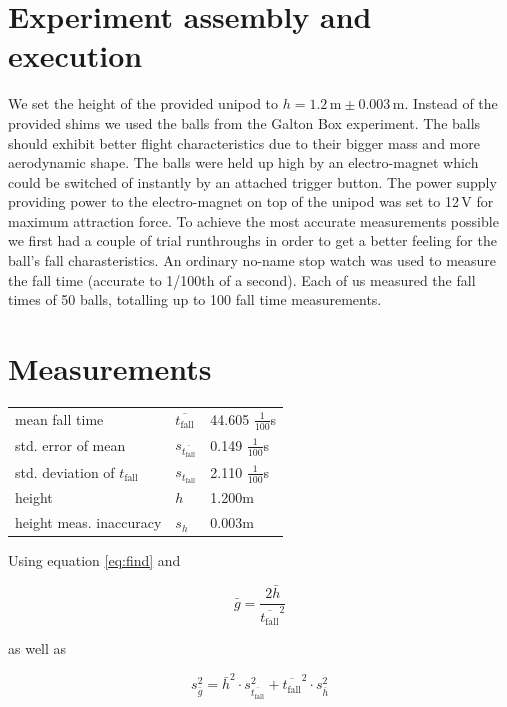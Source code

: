 \documentclass{scrreprt}
\newcommand{\unit}[1]{\ensuremath{\, \mathrm{#1}}}
\begin{document}
\section{Experiment assembly and execution}
We set the height of the provided unipod to $h=1.2\unit{m}\pm 0.003\unit{m}$. Instead of the provided shims we used the balls from the Galton Box experiment. The balls should exhibit better flight characteristics due to their bigger mass and more aerodynamic shape. The balls were held up high by an electro-magnet which could be switched of instantly by an attached trigger button. The power supply providing power to the electro-magnet on top of the unipod was set to 12$\unit{V}$ for maximum attraction force. To achieve the most accurate measurements possible we first had a couple of trial runthroughs in order to get a better feeling for the ball's fall charasteristics. An ordinary no-name stop watch was used to measure the fall time (accurate to 1/100th of a second). Each of us measured the fall times of 50 balls, totalling up to 100 fall time measurements.  

\section{Measurements}


\begin{center}
    \begin{tabular}{l l l}
	mean fall time & $\overline{t_{\text{fall}}}$ & 44.605 $\frac{1}{100}$s\\
	std. error of mean & $s_{\overline{t_{\text{fall}}}}$ & 0.149 $\frac{1}{100}$s\\
	std. deviation of $t_{\text{fall}}$ & $s_{t_{\text{fall}}}$ & 2.110 $\frac{1}{100}$s\\
	height & $h$ & 1.200m\\
	height meas. inaccuracy & $s_h$ & 0.003m   
    \end{tabular}
\end{center}

Using equation \ref{eq:find} and 

\begin{equation}
\bar{g} = \frac{2 \bar{h}}{\overline{t_{\text{fall}}}^2}
\end{equation}

as well as 

\begin{equation}
s_{\bar{g}}^2 = \bar{h}^2 \cdot s_{\overline{t_{\text{fall}}}}^2 + \overline{t_{\text{fall}}}^2 \cdot s_{\bar{h}}^2
\end{equation}
\end{document}
